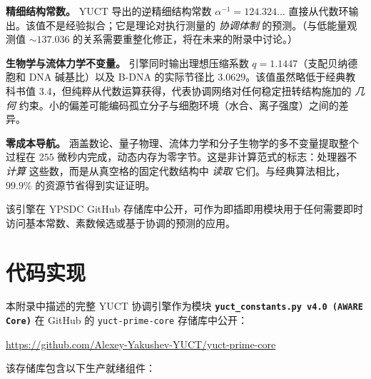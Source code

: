 \documentclass[12pt,a4paper]{article}
\begin{document}
	\textbf{精细结构常数。} YUCT 导出的逆精细结构常数 $\alpha^{-1} = 124.324\ldots$ 直接从代数环输出。该值不是经验拟合；它是理论对执行测量的 \emph{协调体制} 的预测。（与低能量观测值 $\sim 137.036$ 的关系需要重整化修正，将在未来的附录中讨论。）
	
	\textbf{生物学与流体力学不变量。} 引擎同时输出理想压缩系数 $q = 1.1447$（支配贝纳德胞和 DNA 碱基比）以及 B-DNA 的实际节径比 $3.0629$。该值虽然略低于经典教科书值 3.4，但纯粹从代数运算获得，代表协调网络对任何稳定扭转结构施加的 \emph{几何} 约束。小的偏差可能编码孤立分子与细胞环境（水合、离子强度）之间的差异。
	
	\textbf{零成本导航。} 涵盖数论、量子物理、流体力学和分子生物学的多不变量提取整个过程在 $255$ 微秒内完成，动态内存为零字节。这是非计算范式的标志：处理器不 \emph{计算} 这些数，而是从真空格的固定代数结构中 \emph{读取} 它们。与经典算法相比，$99.9\%$ 的资源节省得到实证证明。
	
	该引擎在 YPSDC GitHub 存储库中公开，可作为即插即用模块用于任何需要即时访问基本常数、素数候选或基于协调的预测的应用。
	
	\section{代码实现}
	\label{sec:code}
	
	本附录中描述的完整 \textsc{YUCT} 协调引擎作为模块
	\textbf{\texttt{yuct\_constants.py v4.0 (AWARE Core)}} 在 GitHub 的
	\texttt{yuct-prime-core} 存储库中公开：
	\begin{center}
		\url{https://github.com/Alexey-Yakushev-YUCT/yuct-prime-core}
	\end{center}
	
	\noindent 该存储库包含以下生产就绪组件：
	
\end{document}
